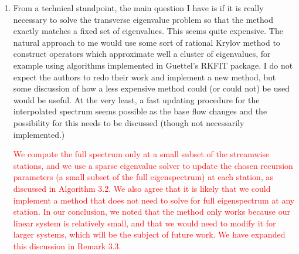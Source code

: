 \documentclass{article}
\newcommand{\response}[1]{\textcolor{red}{#1}}
\begin{document}
\begin{enumerate}
{\begin{itemize}
\begin{itemize}
            \item Proposition 2.30 becomes Proposition 2.28 in the revised manuscript.
        \end{itemize}
        \item We keep proposition 2.31 because it is novel.
        \begin{itemize}
            \item Proposition 2.31 becomes Proposition 2.29 in the revised manuscript.
        \end{itemize}
        \item We keep proposition 2.33 because it is novel and important to our comparison of OWNS-P and OWNS-R.
        \begin{itemize}
            \item Proposition 2.33 becomes Proposition 2.31 in the revised manuscript.
        \end{itemize}
    \end{itemize}
    }
    
    \item From a technical standpoint, the main question I have is if it is really necessary to solve the transverse eigenvalue problem so that the method exactly matches a fixed set of eigenvalues. This seems quite expensive. The natural approach to me would use some sort of rational Krylov method to construct operators which approximate well a cluster of eigenvalues, for example using algorithms implemented in Guettel's RKFIT package. I do not expect the authors to redo their work and implement a new method, but some discussion of how a less expensive method could (or could not) be used would be useful. At the very least, a fast updating procedure for the interpolated spectrum seems possible as the base flow changes and the possibility for this needs to be discussed (though not necessarily implemented.)
    
    \response{We compute the full spectrum only at a small subset of the streamwise stations, and we use a sparse eigenvalue solver to update the chosen recursion parameters (a small subset of the full eigenspectrum) at each station, as discussed in Algorithm 3.2. We also agree that it is likely that we could implement a method that does not need to solve for full eigenspectrum at any station. In our conclusion, we noted that the method only works because our linear system is relatively small, and that we would need to modify it for larger systems, which will be the subject of future work. We have expanded this discussion in Remark 3.3.}
    

\end{enumerate}
\end{document}
